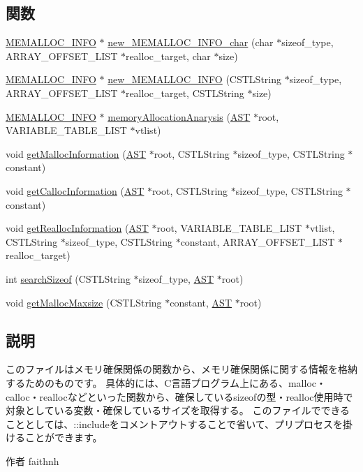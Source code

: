 \subsection*{関数}
\begin{DoxyCompactItemize}
\item 
\hyperlink{structmemory__allocation__info}{MEMALLOC\_\-INFO} $\ast$ \hyperlink{MemallocInfo_8h_afe34555376d69246b3a082014cad78af}{new\_\-MEMALLOC\_\-INFO\_\-char} (char $\ast$sizeof\_\-type, ARRAY\_\-OFFSET\_\-LIST $\ast$realloc\_\-target, char $\ast$size)
\item 
\hyperlink{structmemory__allocation__info}{MEMALLOC\_\-INFO} $\ast$ \hyperlink{MemallocInfo_8h_aed5ea9294b1778c648246294a76b4c6b}{new\_\-MEMALLOC\_\-INFO} (CSTLString $\ast$sizeof\_\-type, ARRAY\_\-OFFSET\_\-LIST $\ast$realloc\_\-target, CSTLString $\ast$size)
\item 
\hyperlink{structmemory__allocation__info}{MEMALLOC\_\-INFO} $\ast$ \hyperlink{MemallocInfo_8h_a1ce27f7b14a1ba76647f0d8dc0cca30e}{memoryAllocationAnarysis} (\hyperlink{structabstract__syntax__tree}{AST} $\ast$root, VARIABLE\_\-TABLE\_\-LIST $\ast$vtlist)
\item 
void \hyperlink{MemallocInfo_8h_a44daa61bf2a56ae7b5a29e7b43dd0e2a}{getMallocInformation} (\hyperlink{structabstract__syntax__tree}{AST} $\ast$root, CSTLString $\ast$sizeof\_\-type, CSTLString $\ast$constant)
\item 
void \hyperlink{MemallocInfo_8h_a6660d813f42687f1cc9f1fecf1f16ef0}{getCallocInformation} (\hyperlink{structabstract__syntax__tree}{AST} $\ast$root, CSTLString $\ast$sizeof\_\-type, CSTLString $\ast$constant)
\item 
void \hyperlink{MemallocInfo_8h_adc8171dd663897d8dbaea3d837453242}{getReallocInformation} (\hyperlink{structabstract__syntax__tree}{AST} $\ast$root, VARIABLE\_\-TABLE\_\-LIST $\ast$vtlist, CSTLString $\ast$sizeof\_\-type, CSTLString $\ast$constant, ARRAY\_\-OFFSET\_\-LIST $\ast$realloc\_\-target)
\item 
int \hyperlink{MemallocInfo_8h_a4db917a362836842caf646ada69b38b8}{searchSizeof} (CSTLString $\ast$sizeof\_\-type, \hyperlink{structabstract__syntax__tree}{AST} $\ast$root)
\item 
void \hyperlink{MemallocInfo_8h_a0f47635fa5f6ec3f88df9d13f3facc85}{getMallocMaxsize} (CSTLString $\ast$constant, \hyperlink{structabstract__syntax__tree}{AST} $\ast$root)
\end{DoxyCompactItemize}


\subsection{説明}
このファイルはメモリ確保関係の関数から、メモリ確保関係に関する情報を格納するためのものです。 具体的には、C言語プログラム上にある、malloc・calloc・reallocなどといった関数から、確保しているsizeofの型・realloc使用時で対象としている変数・確保しているサイズを取得する。 このファイルでできることとしては、::includeをコメントアウトすることで省いて、プリプロセスを掛けることができます。 \begin{DoxyAuthor}{作者}
faithnh 
\end{DoxyAuthor}


